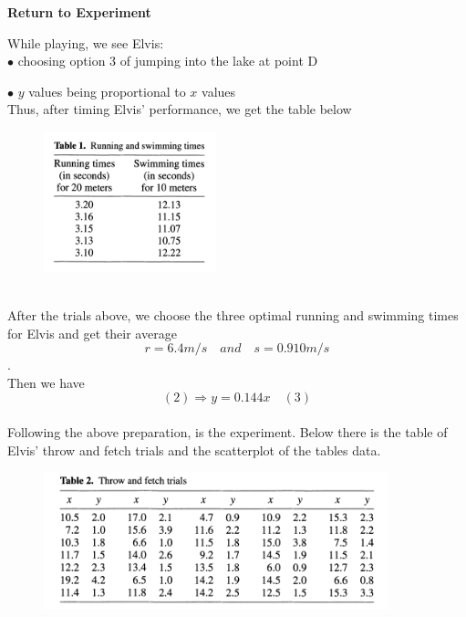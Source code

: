 \documentclass[12pt]{article}
\begin{document}
{\begin{center}
\textbf{Return to Experiment}\\
\end{center}
While playing, we see Elvis: \\

$\bullet$ choosing option $3$ of jumping into the lake at point D\par
$\bullet$ $y$ values being proportional to $x$ values\\

Thus, after timing Elvis' performance, we get the table below\\
\begin{figure}[h!]
  \begin{center}
  \includegraphics[width=50mm]{experimentTable.png}
  \label{fig:path1}
  \end{center}
\end{figure}\\
After the trials above, we choose the three optimal running and swimming times for Elvis and get their average $$r=6.4m/s \quad and \quad s=0.910m/s$$.\\
Then we have $$(2) \Rightarrow y = 0.144x \quad (3)$$\\ \newpage
Following the above preparation, is the experiment. Below there is the table of Elvis' throw and fetch trials and the scatterplot of the tables data.  
\begin{figure}[h!]
  \begin{center}
  \includegraphics[width=100mm]{throwFetchTrials.png}
  \label{fig:path2}
  \end{center}
\end{figure}\\


}
\end{document}
